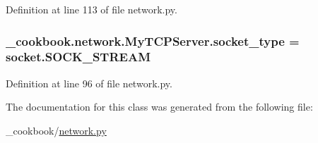 Definition at line 113 of file network.\-py.

\hypertarget{class__cookbook_1_1network_1_1MyTCPServer_ae7f81da7d2ed969bf5df075b09850879}{
\subsubsection[{socket\-\_\-type}]{\setlength{\rightskip}{0pt plus 5cm}\-\_\-cookbook.\-network.\-My\-T\-C\-P\-Server.\-socket\-\_\-type = socket.\-S\-O\-C\-K\-\_\-\-S\-T\-R\-E\-A\-M\hspace{0.3cm}{\ttfamily [static]}}}\label{class__cookbook_1_1network_1_1MyTCPServer_ae7f81da7d2ed969bf5df075b09850879}


Definition at line 96 of file network.\-py.



The documentation for this class was generated from the following file\-:\begin{DoxyCompactItemize}
\item 
\-\_\-cookbook/\hyperlink{network_8py}{network.\-py}\end{DoxyCompactItemize}
